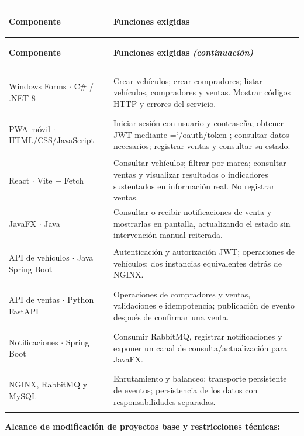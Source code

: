 \documentclass[11pt,a4paper]{article}
\renewcommand{\_}{\oldunderscore\allowbreak}
\DeclareRobustCommand{\texttt}[1]{%
  {\upshape\ttfamily\fontsize{9}{10.8}\selectfont\hyphenchar\font=`\-\relax #1}%
}
\begin{document}
{\renewcommand{\arraystretch}{1.15}
\begin{xltabular}{\textwidth}{|>{\bfseries\raggedright\arraybackslash\hspace{0pt}}p{4.3cm}|X|}
\hline
\textbf{Componente} & \textbf{Funciones exigidas} \\
\hline
\endfirsthead
\hline
\textbf{Componente} & \textbf{Funciones exigidas \textit{(continuación)}} \\
\hline
\endhead
\hline
{} \\
\hline
\endfoot
\hline
\endlastfoot
Windows Forms $\cdot$ C\# / .NET 8 & Crear vehículos; crear compradores; listar vehículos, compradores y ventas. Mostrar códigos HTTP y errores del servicio. \\
\hline
PWA móvil $\cdot$ HTML/CSS/JavaScript & Iniciar sesión con usuario y contraseña; obtener JWT mediante \texttt{/\allowbreak{}oauth/\allowbreak{}token}; consultar datos necesarios; registrar ventas y consultar su estado. \\
\hline
React $\cdot$ Vite + Fetch & Consultar vehículos; filtrar por marca; consultar ventas y visualizar resultados o indicadores sustentados en información real. No registrar ventas. \\
\hline
JavaFX $\cdot$ Java & Consultar o recibir notificaciones de venta y mostrarlas en pantalla, actualizando el estado sin intervención manual reiterada. \\
\hline
API de vehículos $\cdot$ Java Spring Boot & Autenticación y autorización JWT; operaciones de vehículos; dos instancias equivalentes detrás de NGINX. \\
\hline
API de ventas $\cdot$ Python FastAPI & Operaciones de compradores y ventas, validaciones e idempotencia; publicación de evento después de confirmar una venta. \\
\hline
Notificaciones $\cdot$ Spring Boot & Consumir RabbitMQ, registrar notificaciones y exponer un canal de consulta/actualización para JavaFX. \\
\hline
NGINX, RabbitMQ y MySQL & Enrutamiento y balanceo; transporte persistente de eventos; persistencia de los datos con responsabilidades separadas. \\
\end{xltabular}
\addtocounter{table}{-1}}

\vspace{0.3cm}

\noindent\textbf{Alcance de modificación de proyectos base y restricciones técnicas:}
\end{document}
